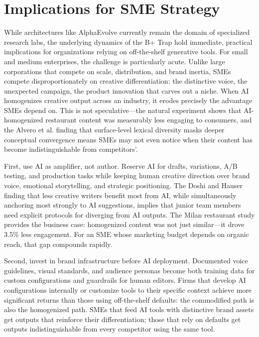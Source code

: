 \documentclass[12pt,a4paper]{article}
\begin{document}
\section{Implications for SME Strategy}
While architectures like AlphaEvolve currently remain the domain of specialized research labs, the underlying dynamics of the B+ Trap hold immediate, practical implications for organizations relying on off-the-shelf generative tools. For small and medium enterprises, the challenge is particularly acute. Unlike large corporations that compete on scale, distribution, and brand inertia, SMEs compete disproportionately on creative differentiation: the distinctive voice, the unexpected campaign, the product innovation that carves out a niche. When AI homogenizes creative output across an industry, it erodes precisely the advantage SMEs depend on. This is not speculative---the \citet{liu2025italy} natural experiment shows that AI-homogenized restaurant content was measurably less engaging to consumers, and the Alvero et al. finding that surface-level lexical diversity masks deeper conceptual convergence means SMEs may not even notice when their content has become indistinguishable from competitors'.

First, use AI as amplifier, not author. Reserve AI for drafts, variations, A/B testing, and production tasks while keeping human creative direction over brand voice, emotional storytelling, and strategic positioning. The Doshi and Hauser finding that less creative writers benefit most from AI, while simultaneously anchoring most strongly to AI suggestions, implies that junior team members need explicit protocols for diverging from AI outputs. The Milan restaurant study provides the business case: homogenized content was not just similar---it drove 3.5\% less engagement. For an SME whose marketing budget depends on organic reach, that gap compounds rapidly.

Second, invest in brand infrastructure before AI deployment. Documented voice guidelines, visual standards, and audience personas become both training data for custom configurations and guardrails for human editors. Firms that develop AI configurations internally or customize tools to their specific context achieve more significant returns than those using off-the-shelf defaults: the commodified path is also the homogenized path. SMEs that feed AI tools with distinctive brand assets get outputs that reinforce their differentiation; those that rely on defaults get outputs indistinguishable from every competitor using the same tool.
\end{document}
